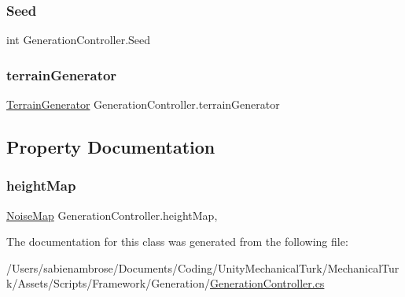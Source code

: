 \mbox{\label{class_generation_controller_a8fc1d7ff7316969411545d4b4a7a547a}} 
\subsubsection{\texorpdfstring{Seed}{Seed}}
{\footnotesize\ttfamily int Generation\+Controller.\+Seed}

\mbox{\label{class_generation_controller_aca0b988596dc14d92fdbd9fb5037c2cd}} 
\subsubsection{\texorpdfstring{terrain\+Generator}{terrainGenerator}}
{\footnotesize\ttfamily \mbox{\hyperlink{class_terrain_generator}{Terrain\+Generator}} Generation\+Controller.\+terrain\+Generator}



\subsection{Property Documentation}
\mbox{\label{class_generation_controller_ada5207d54f73a82b066d367a65dd6035}} 
\subsubsection{\texorpdfstring{height\+Map}{heightMap}}
{\footnotesize\ttfamily \mbox{\hyperlink{class_noise_map}{Noise\+Map}} Generation\+Controller.\+height\+Map\hspace{0.3cm}{\ttfamily [get]}, {\ttfamily [set]}}



The documentation for this class was generated from the following file\+:\begin{DoxyCompactItemize}
\item 
/\+Users/sabienambrose/\+Documents/\+Coding/\+Unity\+Mechanical\+Turk/\+Mechanical\+Turk/\+Assets/\+Scripts/\+Framework/\+Generation/\mbox{\hyperlink{_generation_controller_8cs}{Generation\+Controller.\+cs}}\end{DoxyCompactItemize}
